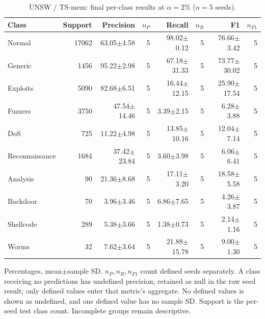 \begin{table}[t]
\centering\scriptsize
\setlength{\tabcolsep}{3.3pt}
\caption{UNSW / TS-mem: final per-class results at $\alpha=2\%$ ($n=5$ seeds).}\label{tab:forgetting-class-unsw_nb15-ts-mem}
\begin{tabular}{lrrrrrrr}
\toprule
Class & Support & Precision & $n_P$ & Recall & $n_R$ & F1 & $n_{F1}$ \\
\midrule
Normal & 17062 & 63.05$\pm$4.58 & 5 & 98.02$\pm$0.12 & 5 & 76.66$\pm$3.42 & 5 \\
Generic & 1456 & 95.22$\pm$2.98 & 5 & 67.18$\pm$31.33 & 5 & 73.77$\pm$30.02 & 5 \\
Exploits & 5090 & 82.68$\pm$6.51 & 5 & 16.44$\pm$12.15 & 5 & 25.90$\pm$17.54 & 5 \\
Fuzzers & 3750 & 47.54$\pm$14.46 & 5 & 3.39$\pm$2.15 & 5 & 6.28$\pm$3.88 & 5 \\
DoS & 725 & 11.22$\pm$4.98 & 5 & 13.85$\pm$10.16 & 5 & 12.04$\pm$7.14 & 5 \\
Reconnaissance & 1684 & 37.42$\pm$23.84 & 5 & 3.60$\pm$3.98 & 5 & 6.06$\pm$6.41 & 5 \\
Analysis & 90 & 21.36$\pm$8.68 & 5 & 17.11$\pm$3.20 & 5 & 18.58$\pm$5.58 & 5 \\
Backdoor & 70 & 3.96$\pm$3.46 & 5 & 6.86$\pm$7.65 & 5 & 4.26$\pm$3.87 & 5 \\
Shellcode & 289 & 5.38$\pm$3.66 & 5 & 1.38$\pm$0.73 & 5 & 2.14$\pm$1.16 & 5 \\
Worms & 32 & 7.62$\pm$3.64 & 5 & 21.88$\pm$15.78 & 5 & 9.00$\pm$1.30 & 5 \\
\bottomrule
\end{tabular}
\par\smallskip\begin{minipage}{0.98\textwidth}\scriptsize Percentages, mean$\pm$sample SD. $n_P,n_R,n_{F1}$ count defined seeds separately. A class receiving no predictions has undefined precision, retained as null in the raw seed result; only defined values enter that metric's aggregate. No defined values is shown as undefined, and one defined value has no sample SD. Support is the per-seed test class count. Incomplete groups remain descriptive.\end{minipage}
\end{table}

